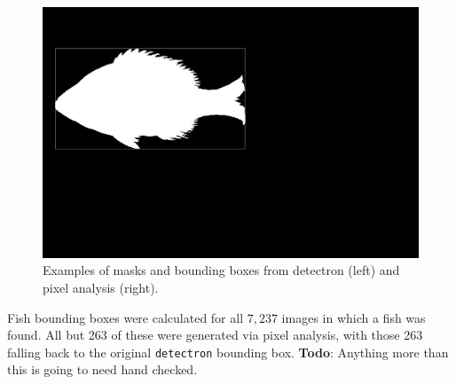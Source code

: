 \documentclass[conference]{IEEEtran}
\begin{document}
\begin{figure}[H]
  \includegraphics[width=0.49\linewidth]{images/56885_mask}
  \caption{Examples of masks and bounding boxes from detectron (left) and pixel analysis (right).}
\end{figure}
Fish bounding boxes were calculated for all \(7,237\) images in which a fish was found. All but 263 of these were generated via pixel analysis, with those 263 falling back to the original \verb|detectron| bounding box. \textbf{Todo}: Anything more than this is going to need hand checked.
\end{document}
